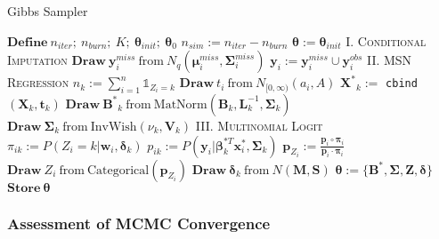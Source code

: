 \documentclass[useAMS,referee]{biom}
\begin{document}
\begin{algorithm}
\caption{Gibbs Sampler}
\begin{algorithmic}
\small
\linespread{0.5}
    \State $\mathbf{Define} \ n_{iter};\  n_{burn}; \ K; \ \boldsymbol\theta_{init}; \ \boldsymbol\theta_0$
    \State $n_{sim} := n_{iter} - n_{burn}$
    \State $\boldsymbol\theta := \boldsymbol\theta_{init}$
        \State \textsc{I. Conditional Imputation}
            \State $\mathbf{Draw} \ \mathbf{y}_i^{miss} \ \text{from} \ N_q(\boldsymbol\mu_i^{miss}, \boldsymbol\Sigma_i^{miss})$
            \State $\mathbf{y}_i := \mathbf{y}_i^{miss} \cup \mathbf{y}_i^{obs}$
         \EndFor
        \State \textsc{II. MSN Regression}
            \State $n_k := \sum_{i = 1}^n \mathds{1}_{Z_i = k}$
              \State $\mathbf{Draw}\  t_i \ \text{from} \ N_{[0,\infty)}(a_i,A)$
            \EndFor
            \State $\mathbf{X^*}_k := $ \texttt{cbind}$(\mathbf{X}_k,\mathbf{t}_k)$
            \State $\mathbf{Draw} \ \mathbf{B^*}_k \ \text{from} \ \text{MatNorm}(\mathbf{B}_k,\mathbf{L}_k^{-1},\boldsymbol\Sigma_k)$
            \State $\mathbf{Draw} \ \boldsymbol\Sigma_k \ \text{from} \ \text{InvWish}(\nu_k, \mathbf{V}_k)$
          \EndFor
        \State \textsc{III. Multinomial Logit}
              \State $\pi_{ik} := P(Z_i = k|\mathbf{w}_i,\boldsymbol\delta_k)$
              \State $p_{ik} := P(\mathbf{y}_i|\boldsymbol\beta_k^{*T} \mathbf{x}^*_i,\boldsymbol\Sigma_k)$
            \EndFor
            \State $\mathbf{p}_{Z_i} := \frac{\mathbf{p}_i \circ \boldsymbol\pi_i}{\mathbf{p}_i \cdot \boldsymbol\pi_i}$
            \State $\mathbf{Draw} \ Z_i \ \text{from} \ \text{Categorical}(\mathbf{p}_{Z_i})$
              \State $\mathbf{Draw} \ \boldsymbol\delta_k \ \text{from} \ N(\mathbf{M},\mathbf{S})$
            \EndFor
          \EndFor
        \State $\boldsymbol\theta := \{\mathbf{B^*}, \boldsymbol\Sigma, \mathbf{Z}, \boldsymbol\delta \}$
        \State $\mathbf{Store} \ \boldsymbol\theta$
	  \EndFor
\end{algorithmic}
\end{algorithm}


\subsubsection{Assessment of MCMC Convergence}
\end{document}
